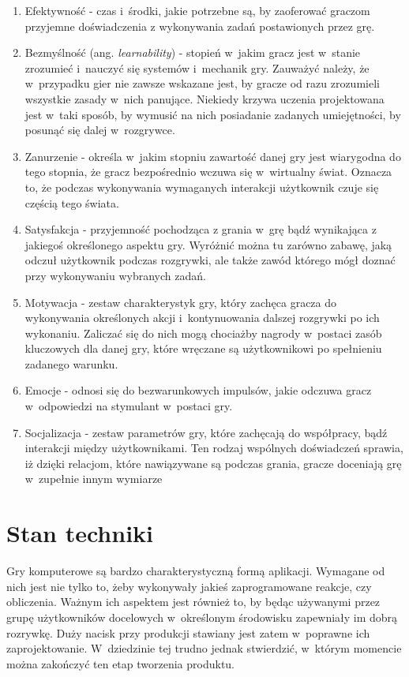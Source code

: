 \documentclass[a4paper,12pt,numbers=noenddot]{report}
\begin{document}
\begin{enumerate}
\item Efektywność - czas i~środki, jakie potrzebne są, by zaoferować graczom przyjemne doświadczenia z wykonywania zadań postawionych przez grę.
\item Bezmyślność (ang. \textit{learnability}) - stopień w~jakim gracz jest w~stanie zrozumieć i~nauczyć się systemów i~mechanik gry. Zauważyć należy, że w~przypadku gier nie zawsze wskazane jest, by gracze od razu zrozumieli wszystkie zasady w~nich panujące. Niekiedy krzywa uczenia projektowana jest w~taki sposób, by wymusić na nich posiadanie zadanych umiejętności, by posunąć się dalej w~rozgrywce.
\item Zanurzenie - określa w~jakim stopniu zawartość danej gry jest wiarygodna do tego stopnia, że gracz bezpośrednio wczuwa się w~wirtualny świat. Oznacza to, że podczas wykonywania wymaganych interakcji użytkownik czuje się częścią tego świata.
\item Satysfakcja - przyjemność pochodząca z grania w~grę bądź wynikająca z jakiegoś określonego aspektu gry. Wyróżnić można tu zarówno zabawę, jaką odczuł użytkownik podczas rozgrywki, ale także zawód którego mógł doznać przy wykonywaniu wybranych zadań.
\item Motywacja - zestaw charakterystyk gry, który zachęca gracza do wykonywania określonych akcji i~kontynuowania dalszej rozgrywki po ich wykonaniu. Zaliczać się do nich mogą chociażby nagrody w~postaci zasób kluczowych dla danej gry, które wręczane są użytkownikowi po spełnieniu zadanego warunku.
\item Emocje - odnosi się do bezwarunkowych impulsów, jakie odczuwa gracz w~odpowiedzi na stymulant w~postaci gry.
\item Socjalizacja - zestaw parametrów gry, które zachęcają do współpracy, bądź interakcji między użytkownikami. Ten rodzaj wspólnych doświadczeń sprawia, iż dzięki relacjom, które nawiązywane są podczas grania, gracze doceniają grę w~zupełnie innym wymiarze 
\end{enumerate}


\chapter{Stan techniki}
Gry komputerowe są bardzo charakterystyczną formą aplikacji. Wymagane od nich jest nie tylko to, żeby wykonywały jakieś zaprogramowane reakcje, czy obliczenia. Ważnym ich aspektem jest również to, by będąc używanymi przez grupę użytkowników docelowych w~określonym środowisku zapewniały im dobrą rozrywkę. Duży nacisk przy produkcji stawiany jest zatem w~poprawne ich zaprojektowanie. W~dziedzinie tej trudno jednak stwierdzić, w~którym momencie można zakończyć ten etap tworzenia produktu. 
\end{document}
